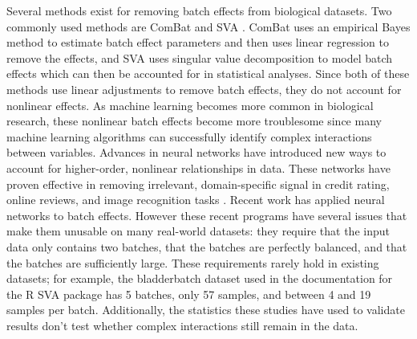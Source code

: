 \documentclass[notitlepage]{article}
\begin{document}
Several methods exist for removing batch effects from biological datasets.
Two commonly used methods are ComBat \citep{johnson_adjusting_2007} and SVA \citep{leek_capturing_2007}.
ComBat uses an empirical Bayes method to estimate batch effect parameters and then uses linear regression to remove the effects, and SVA uses singular value decomposition to model batch effects which can then be accounted for in statistical analyses.
Since both of these methods use linear adjustments to remove batch effects, they do not account for nonlinear effects.
As machine learning becomes more common in biological research, these nonlinear batch effects become more troublesome since many machine learning algorithms can successfully identify complex interactions between variables.
Advances in neural networks have introduced new ways to account for higher-order, nonlinear relationships in data.
These networks have proven effective in removing irrelevant, domain-specific signal in credit rating, online reviews, and image recognition tasks \citep{louizos_variational_2015}.
Recent work \cite{shaham_removal_2017,shaham_batch_2018,upadhyay_removal_2019} has applied neural networks to batch effects.
However these recent programs have several issues that make them unusable on many real-world datasets:
they require that the input data only contains two batches, that the batches are perfectly balanced, and that the batches are sufficiently large.
These requirements rarely hold in existing datasets; for example, the bladderbatch dataset used in the documentation for the R SVA package \cite{leek_bladderbatch_2017,leek_sva_2017} has 5 batches, only 57 samples, and between 4 and 19 samples per batch.
Additionally, the statistics these studies have used to validate results don't test whether complex interactions still remain in the data.
\end{document}
